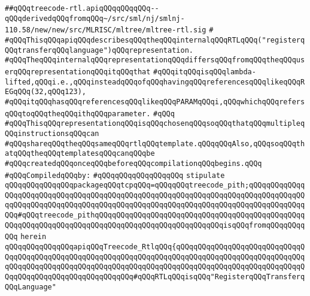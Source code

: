 \label{src/lib/compiler/back/low/treecode/treecode-rtl.api}
\verb|##qQQqtreecode-rtl.apiqQQqqQQqqQQq--qQQqderivedqQQqfromqQQq~/src/sml/nj/smlnj-110.58/new/new/src/MLRISC/mltree/mltree-rtl.sig|\newline
\verb|#|\newline
\verb|#qQQqThisqQQqapiqQQqdescribesqQQqtheqQQqinternalqQQqRTLqQQq("registerqQQqtransferqQQqlanguage")qQQqrepresentation.|\newline
\verb|#qQQqTheqQQqinternalqQQqrepresentationqQQqdiffersqQQqfromqQQqtheqQQquserqQQqrepresentationqQQqitqQQqthat|\newline
\verb|#qQQqitqQQqisqQQqlambda-lifted,qQQqi.e.,qQQqinsteadqQQqofqQQqhavingqQQqreferencesqQQqlikeqQQqREGqQQq(32,qQQq123),|\newline
\verb|#qQQqitqQQqhasqQQqreferencesqQQqlikeqQQqPARAMqQQqi,qQQqwhichqQQqrefersqQQqtoqQQqtheqQQqithqQQqparameter.|\newline
\verb|#qQQq|\newline
\verb|#qQQqThisqQQqrepresentationqQQqisqQQqchosenqQQqsoqQQqthatqQQqmultipleqQQqinstructionsqQQqcan|\newline
\verb|#qQQqshareqQQqtheqQQqsameqQQqrtlqQQqtemplate.qQQqqQQqAlso,qQQqsoqQQqthatqQQqtheqQQqtemplatesqQQqcanqQQqbe|\newline
\verb|#qQQqcreatedqQQqonceqQQqbeforeqQQqcompilationqQQqbegins.qQQq|\newline
\newline
\verb|#qQQqCompiledqQQqby:|\newline
\verb|#qQQqqQQqqQQqqQQqqQQq|\newline
\newline
\newline
\verb|stipulate|\newline
\verb|qQQqqQQqqQQqqQQqpackageqQQqtcpqQQq=qQQqqQQqtreecode_pith;qQQqqQQqqQQqqQQqqQQqqQQqqQQqqQQqqQQqqQQqqQQqqQQqqQQqqQQqqQQqqQQqqQQqqQQqqQQqqQQqqQQqqQQqqQQqqQQqqQQqqQQqqQQqqQQqqQQqqQQqqQQqqQQqqQQqqQQqqQQqqQQqqQQqqQQqqQQq#qQQqtreecode_pithqQQqqQQqqQQqqQQqqQQqqQQqqQQqqQQqqQQqqQQqqQQqqQQqqQQqqQQqqQQqqQQqqQQqqQQqqQQqqQQqqQQqqQQqqQQqqQQqqQQqisqQQqfromqQQqqQQqqQQq|\newline
\verb|herein|\newline
\newline
\verb|qQQqqQQqqQQqqQQqapiqQQqTreecode_RtlqQQq{qQQqqQQqqQQqqQQqqQQqqQQqqQQqqQQqqQQqqQQqqQQqqQQqqQQqqQQqqQQqqQQqqQQqqQQqqQQqqQQqqQQqqQQqqQQqqQQqqQQqqQQqqQQqqQQqqQQqqQQqqQQqqQQqqQQqqQQqqQQqqQQqqQQqqQQqqQQqqQQqqQQqqQQqqQQqqQQqqQQqqQQqqQQqqQQqqQQqqQQq#qQQqRTLqQQqisqQQq"RegisterqQQqTransferqQQqLanguage"|\newline
